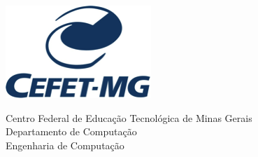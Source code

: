 \begin{folhadeaprovacao} 

\begin{minipage}{0.2\textwidth}
\begin{flushleft} 
\includegraphics[scale=0.7]{figuras/logo.png} 
\end{flushleft}
\end{minipage}
\hfill
\begin{minipage}{0.7\textwidth}
\begin{flushleft}
\begin{center}
Centro Federal de Educação Tecnológica de Minas Gerais \\
Departamento de Computação \\
Engenharia de Computação
\end{center}
\end{flushleft}
\end{minipage}
\vfill

 \vfill
\end{folhadeaprovacao}




